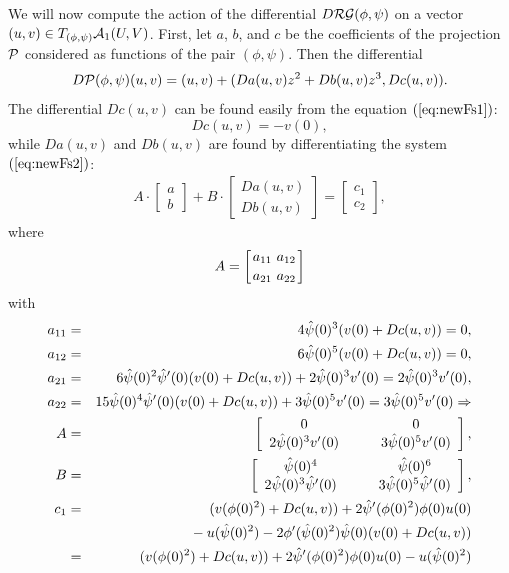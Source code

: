 We will now compute the action of the differential $D \mathcal{RG}(\phi,\psi)$ on a vector $(u,v) \in T_{(\phi,\psi)} \mathcal{A}_1(U,V)$. First, 
let $a$, $b$, and $c$ be the coefficients of the projection $\mathcal{P}$ considered as functions of the pair $(\phi,\psi)$. Then the differential
\begin{equation}
D \mathcal{P}(\phi,\psi) (u,v)=(u,v)+( Da (u,v) z^2+Db (u,v) z^3, Dc (u,v)). 
\end{equation}
The differential $D c (u,v)$ can be found easily from the equation $(\ref{eq:newFs1})$:
$$D c(u,v)=-v(0),$$
while   $D a (u,v)$ and  $D b (u,v)$ are found by differentiating the system $(\ref{eq:newFs2})$:
\begin{eqnarray} \label{eq:newFs3}
A \cdot \left[
\begin{array}{c}
a \\
b
\end{array}
\right]+B \cdot \left[
\begin{array}{c}
D a (u,v) \\
D b (u,v)
\end{array}
\right]=\left[
\begin{array}{c}
c_1 \\
c_2
\end{array}
\right],
\end{eqnarray}
where $$A=\left[ a_{11} \  a_{12}  \atop a_{21}  \  a_{22} \right]$$ with
\begin{eqnarray}
\nonumber a_{11}&=&4 \hat{\psi}(0)^{3}(v(0)+ Dc (u,v))=0, \\
\nonumber a_{12}&=&6 \hat{\psi}(0)^{5}(v(0)+ Dc (u,v))=0, \\
\nonumber a_{21}&=&6 \hat{\psi}(0)^{2}  \hat{\psi}'(0) (v(0)+ Dc (u,v))+ 2 \hat{\psi}(0)^{3} v'(0)=2 \hat{\psi}(0)^{3} v'(0), \\ 
\nonumber a_{22}&=&15 \hat{\psi}(0)^{4} \hat{\psi}'(0)(v(0)+ Dc (u,v))+3 \hat{\psi}(0)^{5} v'(0)= 3 \hat{\psi}(0)^{5} v'(0) \Rightarrow \\
\nonumber A &=&\left[
\begin{array}{c c}
0 \quad  & \quad 0   \\
2 \hat{\psi}(0)^{3} v'(0) \quad  & \quad 3 \hat{\psi}(0)^{5} v'(0)
\end{array}
\right], \\
\nonumber  B&=&  \left[
\begin{array}{c c}
\hat{\psi}(0)^{4} \quad  & \quad \hat{\psi}(0)^{6}   \\
 2 \hat{\psi}(0)^{3}  \hat{\psi}'(0) \quad  & \quad  3 \hat{\psi}(0)^{5} \hat{\psi}'(0)
\end{array}
\right],\\
\nonumber c_1&=&(v(\phi(0)^2)+ Dc (u,v))+2 \hat{\psi}'(\phi(0)^2) \phi(0) u(0) \\
\nonumber &\phantom{=}& \phantom{(v(\phi(0)^2)}- u(\hat{\psi}(0)^2)-2 \phi'(\hat{\psi}(0)^2)\hat{\psi}(0) (v(0)+ Dc (u,v)) \\
 \nonumber &=&(v(\phi(0)^2)+ Dc (u,v))+2 \hat{\psi}'(\phi(0)^2) \phi(0) u(0) - u(\hat{\psi}(0)^2)
\end{eqnarray}
